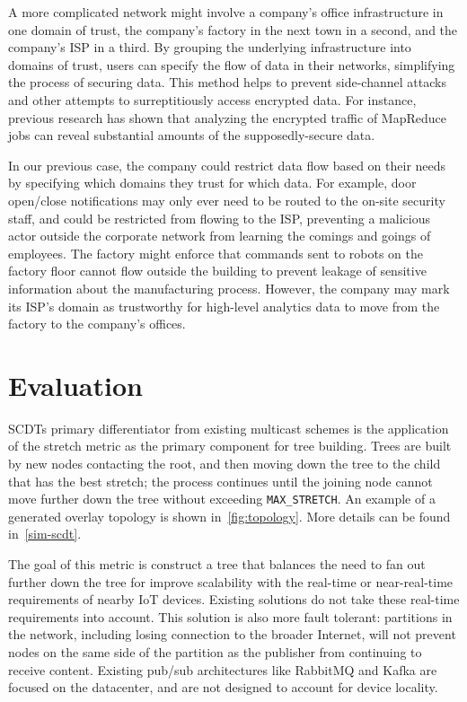 A more complicated network might involve a company's office infrastructure in one domain of trust, the company's factory in the next town in a second, and the company's ISP in a third. By grouping the underlying infrastructure into domains of trust, users can specify the flow of data in their networks, simplifying the process of securing data. This method helps to prevent side-channel attacks and other attempts to surreptitiously access encrypted data. For instance, previous research \cite{sidechannel} has shown that analyzing the encrypted traffic of MapReduce jobs can reveal substantial amounts of the supposedly-secure data.

In our previous case, the company could restrict data flow based on their needs by specifying which domains they trust for which data. For example, door open/close notifications may only ever need to be routed to the on-site security staff, and could be restricted from flowing to the ISP, preventing a malicious actor outside the corporate network from learning the comings and goings of employees. The factory might enforce that commands sent to robots on the factory floor cannot flow outside the building to prevent leakage of sensitive information about the manufacturing process. However, the company may mark its ISP's domain as trustworthy for high-level analytics data to move from the factory to the company's offices. 

\section{Evaluation}
\label{scdt-eval}
SCDTs primary differentiator from existing multicast schemes is the application of the stretch metric as the primary component for tree building. Trees are built by new nodes contacting the root, and then moving down the tree to the child that has the best stretch; the process continues until the joining node cannot move further down the tree without exceeding \texttt{MAX\_STRETCH}. An example of a generated overlay topology is shown in~\autoref{fig:topology}. More details can be found in~\autoref{sim-scdt}.

The goal of this metric is construct a tree that balances the need to fan out further down the tree for improve scalability with the real-time or near-real-time requirements of nearby IoT devices. Existing solutions do not take these real-time requirements into account. This solution is also more fault tolerant: partitions in the network, including losing connection to the broader Internet, will not prevent nodes on the same side of the partition as the publisher from continuing to receive content. Existing pub/sub architectures like RabbitMQ and Kafka are focused on the datacenter, and are not designed to account for device locality.

